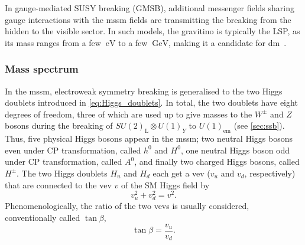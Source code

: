 In gauge-mediated SUSY breaking (GMSB), additional messenger fields sharing gauge interactions with the \gls{mssm} fields are transmitting the breaking from the hidden to the visible sector. In such models, the gravitino is typically the LSP, as its mass ranges from a few $\SI{}{\eV}$ to a few $\SI{}{\GeV}$, making it a candidate for \gls{dm}~\cite{Feng:2003xh}.

\subsubsection{Mass spectrum}

In the \gls{mssm}, electroweak symmetry breaking is generalised to the two Higgs doublets introduced in \cref{eq:Higgs_doublets}. In total, the two doublets have eight degrees of freedom, three of which are used up to give masses to the $W^\pm$ and $Z$ bosons during the breaking of $SU(2)_\mathrm{L}\otimes U(1)_Y$ to $U(1)_\mathrm{em}$ (see \cref{sec:ssb}). Thus, five physical Higgs bosons appear in the \gls{mssm}; two neutral Higgs bosons even under CP transformation, called $h^0$ and $H^0$, one neutral Higgs boson odd under CP transformation, called $A^0$, and finally two charged Higgs bosons, called $H^\pm$. The two Higgs doublets $H_u$ and $H_d$ each get a \gls{vev} ($v_u$ and $v_d$, respectively) that are connected to the \gls{vev} $v$ of the SM Higgs field by
\begin{equation}
	v_u^2 + v_d^2 = v^2.
\end{equation}
Phenomenologically, the ratio of the two \glspl{vev} is usually considered, conventionally called $\tan{\beta}$,
\begin{equation}
	\tan{\beta} = \frac{v_u}{v_d}.
\end{equation}

